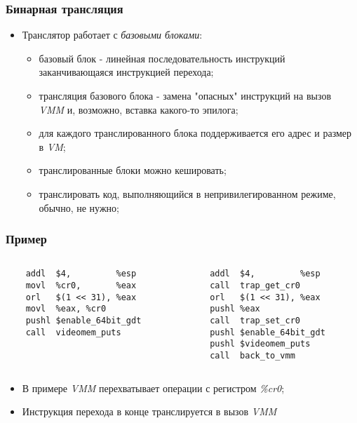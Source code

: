 \begin{frame}
\frametitle{Бинарная трансляция}
\begin{itemize}
  \item Транслятор работает с \emph{базовыми блоками}:
    \begin{itemize}
      \item базовый блок - линейная последовательность инструкций заканчивающаяся
            инструкцией перехода;
      \item трансляция базового блока - замена "опасных" инструкций на вызов
            \emph{VMM} и, возможно, вставка какого-то эпилога;
      \item для каждого транслированного блока поддерживается его адрес и размер
            в \emph{VM};
      \item транслированные блоки можно кешировать;
      \item транслировать код, выполняющийся в непривилегированном режиме,
            обычно, не нужно;
    \end{itemize}
\end{itemize}
\end{frame}

\begin{frame}[fragile]
\frametitle{Пример}
\begin{columns}[T]
  \begin{column}{.4\linewidth}
    \begin{lstlisting}
    addl  $4,         %esp
    movl  %cr0,       %eax
    orl   $(1 << 31), %eax
    movl  %eax, %cr0
    pushl $enable_64bit_gdt
    call  videomem_puts
    \end{lstlisting}
  \end{column}
  \begin{column}{.4\linewidth}
    \begin{lstlisting}
    addl  $4,         %esp
    call  trap_get_cr0
    orl   $(1 << 31), %eax
    pushl %eax
    call  trap_set_cr0
    pushl $enable_64bit_gdt
    pushl $videomem_puts
    call  back_to_vmm
    \end{lstlisting}
  \end{column}
\end{columns}
\begin{itemize}
  \item В примере \emph{VMM} перехватывает операции с регистром \emph{\%cr0};
  \item Инструкция перехода в конце транслируется в вызов \emph{VMM}
\end{itemize}
\end{frame}

